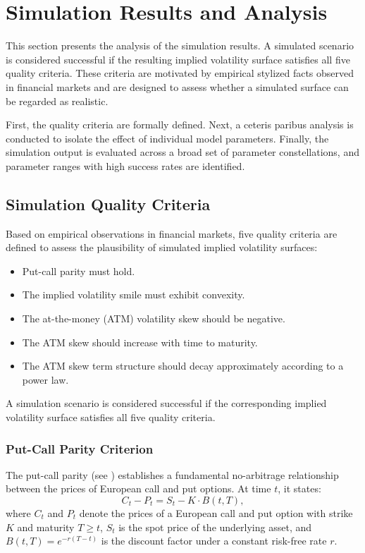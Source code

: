 \section{Simulation Results and Analysis} \label{sec:SimulationResultsAnalysis}

This section presents the analysis of the simulation results. A simulated scenario is considered successful if the resulting implied volatility surface satisfies all five quality criteria. These criteria are motivated by empirical stylized facts observed in financial markets and are designed to assess whether a simulated surface can be regarded as realistic.

First, the quality criteria are formally defined. Next, a ceteris paribus analysis is conducted to isolate the effect of individual model parameters. Finally, the simulation output is evaluated across a broad set of parameter constellations, and parameter ranges with high success rates are identified.


\subsection{Simulation Quality Criteria} \label{subsec:SimulationQualityCriteria}

Based on empirical observations in financial markets, five quality criteria are defined to assess the plausibility of simulated implied volatility surfaces:
\begin{itemize}
    \item Put-call parity must hold.
    \item The implied volatility smile must exhibit convexity.
    \item The at-the-money (ATM) volatility skew should be negative.
    \item The ATM skew should increase with time to maturity.
    \item The ATM skew term structure should decay approximately according to a power law.
\end{itemize}
A simulation scenario is considered successful if the corresponding implied volatility surface satisfies all five quality criteria.

\subsubsection*{Put-Call Parity Criterion}
The put-call parity (see \citealp{Björk2009}) establishes a fundamental no-arbitrage relationship between the prices of European call and put options. At time $t$, it states:
\begin{equation} \label{eq:PutCallParity}
    C_t - P_t = S_t - K \cdot B(t,T),
\end{equation}
where $C_t$ and $P_t$ denote the prices of a European call and put option with strike $K$ and maturity $T \geq t$, $S_t$ is the spot price of the underlying asset, and $B(t,T) = e^{-r(T - t)}$ is the discount factor under a constant risk-free rate $r$.

